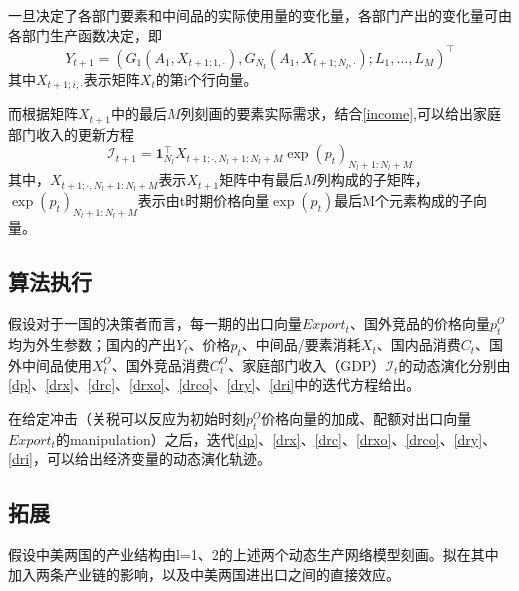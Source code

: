 \documentclass{article}
\begin{document}
一旦决定了各部门要素和中间品的实际使用量的变化量，各部门产出的变化量可由各部门生产函数决定，即
\begin{equation}\label{dry}
    Y_{t+1}=\left(G_1(A_1,X_{t+1;1,\cdot}),G_{N_l}(A_1,X_{t+1;N_l,\cdot});L_1,\dots,L_M\right)^\top
    \end{equation}其中$X_{t+1;i,\cdot}$表示矩阵$X_t$的第i个行向量。

而根据矩阵$X_{t+1}$中的最后$M$列刻画的要素实际需求，结合\eqref{income},可以给出家庭部门收入的更新方程
\begin{equation}\label{dri}
    \mathcal{I}_{t+1}=\mathbf{1}_{N_l}^\top X_{t+1;\cdot,N_l+1:N_l+M}\exp(p_t)_{N_l+1:N_l+M}
\end{equation} 其中，$X_{t+1;\cdot,N_l+1:N_l+M}$表示$X_{t+1}$矩阵中有最后$M$列构成的子矩阵，$\exp(p_t)_{N_l+1:N_l+M}$表示由t时期价格向量$\exp(p_t)$最后M个元素构成的子向量。

\subsection{算法执行}
假设对于一国的决策者而言，每一期的出口向量$Export_t$、国外竞品的价格向量$p_t^O$均为外生参数；国内的产出$Y_t$、价格$p_t$、中间品/要素消耗$X_t$、国内品消费$C_t$、国外中间品使用$X_t^O$、国外竞品消费$C_t^O$、家庭部门收入（GDP）$\mathcal{I}_t$的动态演化分别由\eqref{dp}、\eqref{drx}、\eqref{drc}、\eqref{drxo}、\eqref{drco}、\eqref{dry}、\eqref{dri}中的迭代方程给出。

在给定冲击（关税可以反应为初始时刻$p_t^O$价格向量的加成、配额对出口向量$Export_t$的manipulation）之后，迭代\eqref{dp}、\eqref{drx}、\eqref{drc}、\eqref{drxo}、\eqref{drco}、\eqref{dry}、\eqref{dri}，可以给出经济变量的动态演化轨迹。

\subsection{拓展}
假设中美两国的产业结构由l=1、2的上述两个动态生产网络模型刻画。拟在其中加入两条产业链的影响，以及中美两国进出口之间的直接效应。
\end{document}
